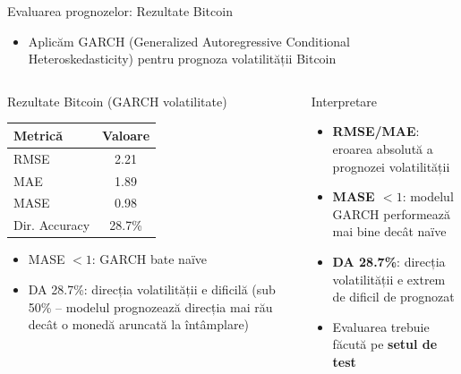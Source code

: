 \documentclass[9pt, aspectratio=169, t]{beamer}
\begin{document}
\begin{frame}{Evaluarea prognozelor: Rezultate Bitcoin}
    \vspace{-0.1cm}
    {\scriptsize
    \begin{block}{}
        \begin{itemize}\setlength{\itemsep}{0pt}
            \item Aplicăm GARCH (Generalized Autoregressive Conditional Heteroskedasticity) pentru prognoza volatilității Bitcoin
        \end{itemize}
    \end{block}
    }
    \vspace{-0.1cm}
    \begin{columns}[T]
        \begin{alertblock}{Rezultate Bitcoin (GARCH volatilitate)}
            \begin{tabular}{lc}
                \textbf{Metrică} & \textbf{Valoare} \\
                \midrule
                RMSE & 2.21 \\
                MAE & 1.89 \\
                MASE & 0.98 \\
                Dir. Accuracy & 28.7\% \\
            \end{tabular}
            \vspace{0.2cm}
            \begin{itemize}\setlength{\itemsep}{2pt}
                \item MASE $< 1$: GARCH bate naïve
                \item DA 28.7\%: direcția volatilității e dificilă (sub 50\% -- modelul prognozează direcția mai rău decât o monedă aruncată la întâmplare)
            \end{itemize}
        \end{alertblock}

        \begin{block}{Interpretare}
            \begin{itemize}\setlength{\itemsep}{4pt}
                \item \textbf{RMSE/MAE}: eroarea absolută a prognozei volatilității
                \item \textbf{MASE $< 1$}: modelul GARCH performează mai bine decât naïve
                \item \textbf{DA 28.7\%}: direcția volatilității e extrem de dificil de prognozat
                \item Evaluarea trebuie făcută pe \textbf{setul de test}
            \end{itemize}
        \end{block}
    \end{columns}
\end{frame}
\end{document}

